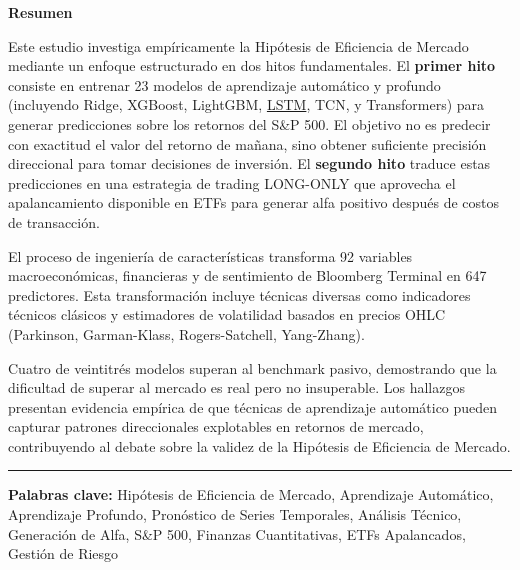 \documentclass[11pt,a4paper]{article}
\newcommand{\gterm}[2]{\hyperref[glos:#1]{#2}}
\begin{document}
\begin{minipage}{0.95\textwidth}
\small
{}
\textbf{Resumen}

\vspace{0.3cm}

Este estudio investiga empíricamente la Hipótesis de Eficiencia de Mercado mediante un enfoque estructurado en dos hitos fundamentales. El \textbf{primer hito} consiste en entrenar 23 modelos de aprendizaje automático y profundo (incluyendo Ridge, XGBoost, LightGBM, \gterm{lstm}{LSTM}, TCN, y Transformers) para generar predicciones sobre los retornos del S\&P 500. El objetivo no es predecir con exactitud el valor del retorno de mañana, sino obtener suficiente precisión direccional para tomar decisiones de inversión. El \textbf{segundo hito} traduce estas predicciones en una estrategia de trading LONG-ONLY que aprovecha el apalancamiento disponible en ETFs para generar alfa positivo después de costos de transacción.

El proceso de ingeniería de características transforma 92 variables macroeconómicas, financieras y de sentimiento de Bloomberg Terminal en 647 predictores. Esta transformación incluye técnicas diversas como indicadores técnicos clásicos y estimadores de volatilidad basados en precios OHLC (Parkinson, Garman-Klass, Rogers-Satchell, Yang-Zhang).

Cuatro de veintitrés modelos superan al benchmark pasivo, demostrando que la dificultad de superar al mercado es real pero no insuperable. Los hallazgos presentan evidencia empírica de que técnicas de aprendizaje automático pueden capturar patrones direccionales explotables en retornos de mercado, contribuyendo al debate sobre la validez de la Hipótesis de Eficiencia de Mercado.

\end{minipage}

\vspace{0.8cm}

\begin{center}
\noindent\rule{0.9\textwidth}{0.5pt}
\end{center}

\newpage

\vspace*{0.5cm}

\textbf{Palabras clave:} Hipótesis de Eficiencia de Mercado, Aprendizaje Automático, Aprendizaje Profundo, Pronóstico de Series Temporales, Análisis Técnico, Generación de Alfa, S\&P 500, Finanzas Cuantitativas, ETFs Apalancados, Gestión de Riesgo
\end{document}
